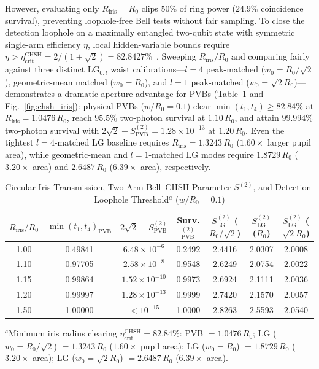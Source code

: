 \documentclass{optica-article}
\begin{document}
However, evaluating only $R_{\mathrm{iris}} = R_0$ clips $50\%$ of ring power ($24.9\%$ coincidence survival), preventing loophole-free Bell tests without fair sampling. To close the detection loophole on a maximally entangled two-qubit state with symmetric single-arm efficiency $\eta$, local hidden-variable bounds require $\eta > \eta_{\mathrm{crit}}^{\mathrm{CHSH}} = 2/(1+\sqrt{2}) = 82.8427\%$~\cite{Eberhard1993,Vertesi2010}. Sweeping $R_{\mathrm{iris}}/R_0$ and comparing fairly against three distinct $\mathrm{LG}_{0,l}$ waist calibrations---$l=4$ peak-matched ($w_0 = R_0/\sqrt{2}$), geometric-mean matched ($w_0 = R_0$), and $l=1$ peak-matched ($w_0 = \sqrt{2}R_0$)---demonstrates a dramatic aperture advantage for PVBs (Table~\ref{tab:chsh_loophole} and Fig.~\ref{fig:chsh_iris}): physical PVBs ($w/R_0 = 0.1$) clear $\min(t_1,t_4) \ge 82.84\%$ at $R_{\mathrm{iris}} = 1.0476\,R_0$, reach $95.5\%$ two-photon survival at $1.10\,R_0$, and attain $99.994\%$ two-photon survival with $2\sqrt{2} - S_{\mathrm{PVB}}^{(2)} = 1.28\times 10^{-13}$ at $1.20\,R_0$. Even the tightest $l=4$-matched LG baseline requires $R_{\mathrm{iris}} = 1.3243\,R_0$ ($1.60\times$ larger pupil area), while geometric-mean and $l=1$-matched LG modes require $1.8729\,R_0$ ($3.20\times$ area) and $2.6487\,R_0$ ($6.39\times$ area), respectively.

\begin{table}[htbp]
  \centering
  \caption{Circular-Iris Transmission, Two-Arm Bell--CHSH Parameter $S^{(2)}$, and Detection-Loophole Threshold$^a$ ($w/R_0 = 0.1$)}
  \label{tab:chsh_loophole}
  \scriptsize
  \renewcommand{\arraystretch}{1.14}
  \setlength{\tabcolsep}{4pt}
  \begin{tabular}{@{}ccccccc@{}}
  \toprule
  $R_{\mathrm{iris}}/R_0$ & $\min(t_1,t_4)_{\mathrm{PVB}}$ & $2\sqrt{2}-S_{\mathrm{PVB}}^{(2)}$ & Surv.$_{\mathrm{PVB}}^{(2)}$ & $S_{\mathrm{LG}}^{(2)}$ ($R_0/\sqrt{2}$) & $S_{\mathrm{LG}}^{(2)}$ ($R_0$) & $S_{\mathrm{LG}}^{(2)}$ ($\sqrt{2}R_0$) \\
  \midrule
  1.00 & 0.49841 & $6.48\times 10^{-6}$ & 0.2492 & 2.4416 & 2.0307 & 2.0008 \\
  1.10 & 0.97705 & $2.58\times 10^{-8}$ & 0.9548 & 2.6249 & 2.0754 & 2.0022 \\
  1.15 & 0.99864 & $1.52\times 10^{-10}$ & 0.9973 & 2.6924 & 2.1111 & 2.0036 \\
  1.20 & 0.99997 & $1.28\times 10^{-13}$ & 0.9999 & 2.7420 & 2.1570 & 2.0057 \\
  1.50 & 1.00000 & $<10^{-15}$ & 1.0000 & 2.8263 & 2.5593 & 2.0540 \\
  \bottomrule
  \end{tabular}

  \smallskip
  \noindent\parbox{0.96\textwidth}{\scriptsize $^a$Minimum iris radius clearing $\eta_{\mathrm{crit}}^{\mathrm{CHSH}} = 82.84\%$: PVB $= 1.0476\,R_0$; LG ($w_0=R_0/\sqrt{2}$) $= 1.3243\,R_0$ ($1.60\times$ pupil area); LG ($w_0=R_0$) $= 1.8729\,R_0$ ($3.20\times$ area); LG ($w_0=\sqrt{2}R_0$) $= 2.6487\,R_0$ ($6.39\times$ area).}
\end{table}
\end{document}
